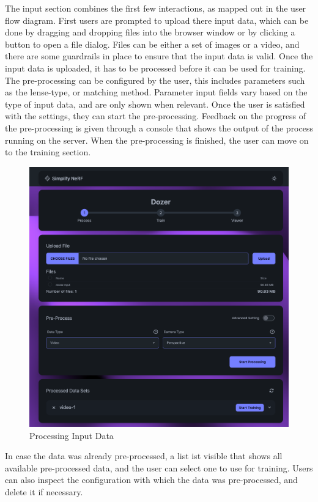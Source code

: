 The input section combines the first few interactions, as mapped out in the user flow diagram.
First users are prompted to upload there input data, which can be done by dragging and dropping files into the browser window or by clicking a button to open a file dialog.
Files can be either a set of images or a video, and there are some guardrails in place to ensure that the input data is valid.
Once the input data is uploaded, it has to be processed before it can be used for training. 
The pre-processing can be configured by the user, this includes parameters such as the lense-type, or matching method.
Parameter input fields vary based on the type of input data, and are only shown when relevant.
Once the user is satisfied with the settings, they can start the pre-processing.
Feedback on the progress of the pre-processing is given through a console that shows the output of the process running on the server.
When the pre-processing is finished, the user can move on to the training section. 

\begin{figure}[htb]
  \includegraphics[width=\textwidth]{figures/view-process.png}
  \caption{Processing Input Data}
  \label{fig:design:input-section}
\end{figure}

In case the data was already pre-processed, a list ist visible that shows all available pre-processed data, and the user can select one to use for training.
Users can also inspect the configuration with which the data was pre-processed, and delete it if necessary.

